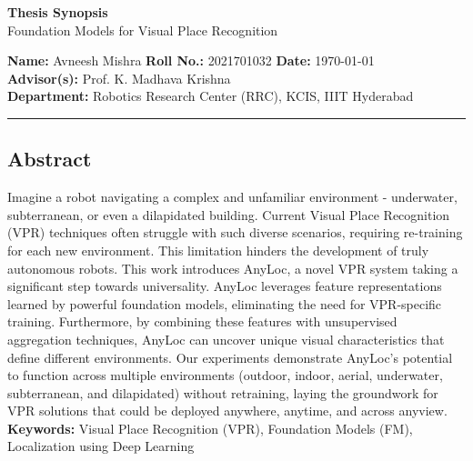 \documentclass{article}
\begin{document}
    \begin{center}
        {\bfseries\Large Thesis Synopsis} \\ [2.5mm]
        {\large Foundation Models for Visual Place Recognition}
    \end{center}
    {\bf Name:} Avneesh Mishra
    \hfill {\bf Roll No.:} 2021701032
    \hfill {\bf Date:} \today \\ [2mm]
    {\bf Advisor(s):} Prof. K. Madhava Krishna \\ [2mm]
    {\bf Department:} Robotics Research Center (RRC), KCIS, IIIT Hyderabad
    \vspace{2mm}
    \hrule
    \begin{center}
    \subsection*{\centering Abstract}
    \begin{minipage}{0.85\textwidth}
        Imagine a robot navigating a complex and unfamiliar
        environment - underwater, subterranean, or even a dilapidated
        building. Current Visual Place Recognition (VPR) techniques
        often struggle with such diverse scenarios, requiring
        re-training for each new environment. This limitation hinders
        the development of truly autonomous robots. This work
        introduces AnyLoc, a novel VPR system taking a significant
        step towards universality. AnyLoc leverages feature
        representations learned by powerful foundation models,
        eliminating the need for VPR-specific training. Furthermore,
        by combining these features with unsupervised aggregation
        techniques, AnyLoc can uncover unique visual characteristics
        that define different environments. Our experiments
        demonstrate AnyLoc’s potential to function across multiple
        environments (outdoor, indoor, aerial, underwater,
        subterranean, and dilapidated) without retraining, laying the
        groundwork for VPR solutions that could be deployed anywhere,
        anytime, and across anyview. \\ [2mm]
        {\bf Keywords:} Visual Place Recognition (VPR), Foundation 
        Models (FM), Localization using Deep Learning
    \end{minipage} \\ [2mm]
    \end{center}
\end{document}
